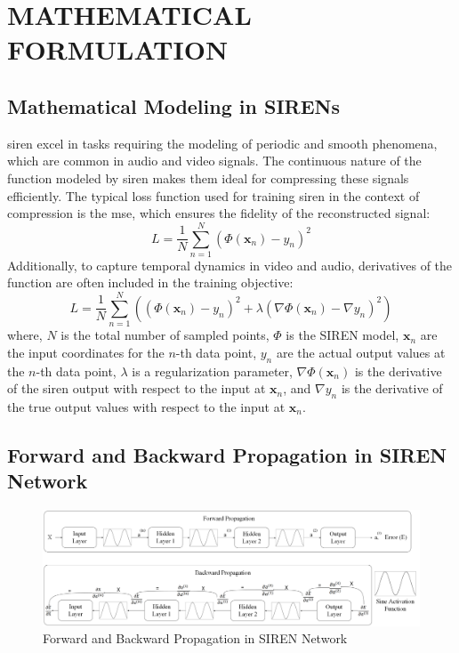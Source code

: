 \section{\MakeUppercase{Mathematical Formulation}}

\subsection{Mathematical Modeling in SIRENs}
\gls{siren} excel in tasks requiring the modeling of periodic and smooth phenomena, which are common in audio and video signals. The continuous nature of the function modeled by \gls{siren} makes them ideal for compressing these signals efficiently. The typical loss function used for training \gls{siren} in the context of compression is the \gls{mse}, which ensures the fidelity of the reconstructed signal:
\begin{equation}
    L = \frac{1}{N} \sum_{n=1}^N (\Phi(\mathbf{x}_n) - y_n)^2 
\end{equation}
Additionally, to capture temporal dynamics in video and audio, derivatives of the function are often included in the training objective:
\begin{equation}
    L = \frac{1}{N} \sum_{n=1}^N \left((\Phi(\mathbf{x}_n) - y_n)^2 + \lambda (\nabla\Phi(\mathbf{x}_n) - \nabla y_n)^2\right) 
\end{equation}
where, \( N \) is the total number of sampled points, \( \Phi \) is the SIREN model, \( \mathbf{x}_n \) are the input coordinates for the \(n\)-th data point, \( y_n \) are the actual output values at the \(n\)-th data point, \( \lambda \) is a regularization parameter, \( \nabla\Phi(\mathbf{x}_n) \) is the derivative of the \gls{siren} output with respect to the input at \( \mathbf{x}_n \), and \( \nabla y_n \) is the derivative of the true output values with respect to the input at \( \mathbf{x}_n \).


\subsection{Forward and Backward Propagation in SIREN Network}
\begin{figure}[H]
    \centering
    \includegraphics[width=\linewidth]{assets/Propagation concept figure Major Project.png}
    \caption{Forward and Backward Propagation in SIREN Network}
    \label{fig:propagation-diagram}
\end{figure}

